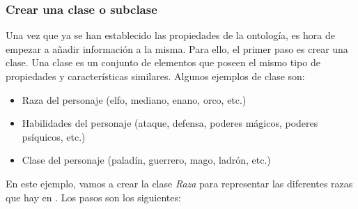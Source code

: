 \subsubsection{Crear una clase o subclase} \label{CreateSubclass}
Una vez que ya se han establecido las propiedades de la ontología, es hora de empezar a añadir información a la misma.
Para ello, el primer paso es crear una clase. Una clase es un conjunto de elementos que poseen el mismo tipo de propiedades 
y características similares. Algunos ejemplos de clase son:
\begin{itemize}
    \item Raza del personaje (elfo, mediano, enano, orco, etc.)
    \item Habilidades del personaje (ataque, defensa, poderes mágicos, poderes psíquicos, etc.)
    \item Clase del personaje (paladín, guerrero, mago, ladrón, etc.)
\end{itemize}

En este ejemplo, vamos a crear la clase \textit{Raza} para representar las diferentes razas que hay en \anima.
Los pasos son los siguientes: 

